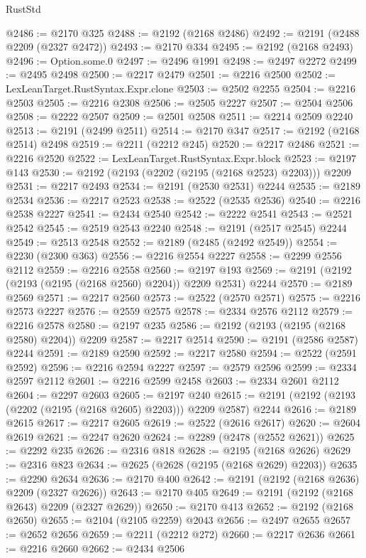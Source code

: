 \begin{lexlean}{RustStd}
\begin{coremodule}
@2486 := @2170 @325
@2488 := @2192 (@2168 @2486)
@2492 := @2191 (@2488 @2209 (@2327 @2472))
@2493 := @2170 @334
@2495 := @2192 (@2168 @2493)
@2496 := Option.some.{0}
@2497 := @2496 @1991
@2498 := @2497 @2272
@2499 := @2495 @2498
@2500 := @2217 @2479
@2501 := @2216 @2500
@2502 := LexLeanTarget.RustSyntax.Expr.clone
@2503 := @2502 @2255
@2504 := @2216 @2503
@2505 := @2216 @2308
@2506 := @2505 @2227
@2507 := @2504 @2506
@2508 := @2222 @2507
@2509 := @2501 @2508
@2511 := @2214 @2509 @2240
@2513 := @2191 (@2499 @2511)
@2514 := @2170 @347
@2517 := @2192 (@2168 @2514) @2498
@2519 := @2211 (@2212 @245)
@2520 := @2217 @2486
@2521 := @2216 @2520
@2522 := LexLeanTarget.RustSyntax.Expr.block
@2523 := @2197 @143
@2530 := @2192 (@2193 (@2202 (@2195 (@2168 @2523) @2203))) @2209
@2531 := @2217 @2493
@2534 := @2191 (@2530 @2531) @2244
@2535 := @2189 @2534
@2536 := @2217 @2523
@2538 := @2522 (@2535 @2536)
@2540 := @2216 @2538 @2227
@2541 := @2434 @2540
@2542 := @2222 @2541
@2543 := @2521 @2542
@2545 := @2519 @2543 @2240
@2548 := @2191 (@2517 @2545) @2244
@2549 := @2513 @2548
@2552 := @2189 (@2485 (@2492 @2549))
@2554 := @2230 (@2300 @363)
@2556 := @2216 @2554 @2227
@2558 := @2299 @2556 @2112
@2559 := @2216 @2558
@2560 := @2197 @193
@2569 := @2191 (@2192 (@2193 (@2195 (@2168 @2560) @2204)) @2209 @2531) @2244
@2570 := @2189 @2569
@2571 := @2217 @2560
@2573 := @2522 (@2570 @2571)
@2575 := @2216 @2573 @2227
@2576 := @2559 @2575
@2578 := @2334 @2576 @2112
@2579 := @2216 @2578
@2580 := @2197 @235
@2586 := @2192 (@2193 (@2195 (@2168 @2580) @2204)) @2209
@2587 := @2217 @2514
@2590 := @2191 (@2586 @2587) @2244
@2591 := @2189 @2590
@2592 := @2217 @2580
@2594 := @2522 (@2591 @2592)
@2596 := @2216 @2594 @2227
@2597 := @2579 @2596
@2599 := @2334 @2597 @2112
@2601 := @2216 @2599 @2458
@2603 := @2334 @2601 @2112
@2604 := @2297 @2603
@2605 := @2197 @240
@2615 := @2191 (@2192 (@2193 (@2202 (@2195 (@2168 @2605) @2203))) @2209 @2587) @2244
@2616 := @2189 @2615
@2617 := @2217 @2605
@2619 := @2522 (@2616 @2617)
@2620 := @2604 @2619
@2621 := @2247 @2620
@2624 := @2289 (@2478 (@2552 @2621))
@2625 := @2292 @235
@2626 := @2316 @818
@2628 := @2195 (@2168 @2626)
@2629 := @2316 @823
@2634 := @2625 (@2628 (@2195 (@2168 @2629) @2203))
@2635 := @2290 @2634
@2636 := @2170 @400
@2642 := @2191 (@2192 (@2168 @2636) @2209 (@2327 @2626))
@2643 := @2170 @405
@2649 := @2191 (@2192 (@2168 @2643) @2209 (@2327 @2629))
@2650 := @2170 @413
@2652 := @2192 (@2168 @2650)
@2655 := @2104 (@2105 @2259) @2043
@2656 := @2497 @2655
@2657 := @2652 @2656
@2659 := @2211 (@2212 @272)
@2660 := @2217 @2636
@2661 := @2216 @2660
@2662 := @2434 @2506

\end{coremodule}
\end{lexlean}
